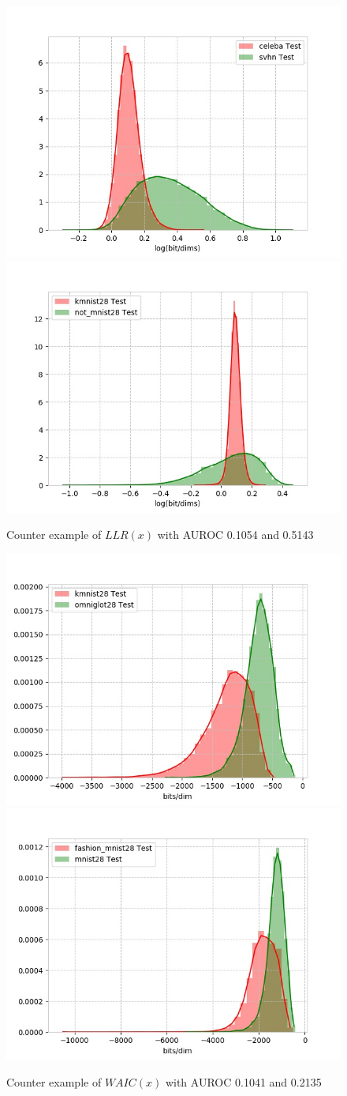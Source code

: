 \documentclass[a3paper]{article}
\begin{document}
\begin{figure}[H]
\includegraphics[width=0.5\columnwidth]{figures/kl_histogram}
\includegraphics[width=0.5\columnwidth]{figures/kl_histogram-1}
\caption{Counter example of $LLR(x)$ with AUROC 0.1054 and 0.5143}
\end{figure}

\begin{figure}[H]
\includegraphics[width=0.5\columnwidth]{figures/ll_waic_histogram}
\includegraphics[width=0.5\columnwidth]{figures/ll_waic_histogram-1}
\caption{Counter example of $WAIC(x)$ with AUROC 0.1041 and 0.2135}
\end{figure}
\end{document}
